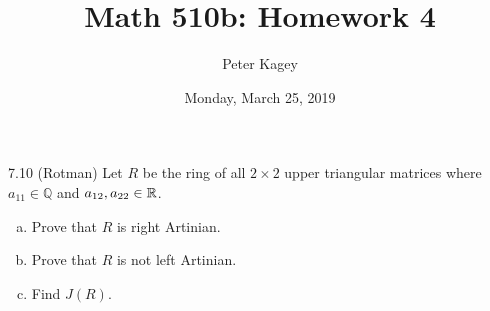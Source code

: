 \documentclass{article}
\begin{document}
\title{Math 510b: Homework 4}
\author{Peter Kagey}
\date{Monday, March 25, 2019}

\maketitle

\begin{problem}{7.10 (Rotman)} %
  Let $R$ be the ring of all $2 \times 2$ upper triangular matrices where $a_{11} \in \mathbb Q$ and $a_{12}, a_{22} \in \mathbb R$.
  \begin{enumerate}[(a)]
    \item Prove that $R$ is right Artinian.
    \item Prove that $R$ is not left Artinian.
    \item Find $J(R)$.  %
  \end{enumerate}
\end{problem}
\end{document}
